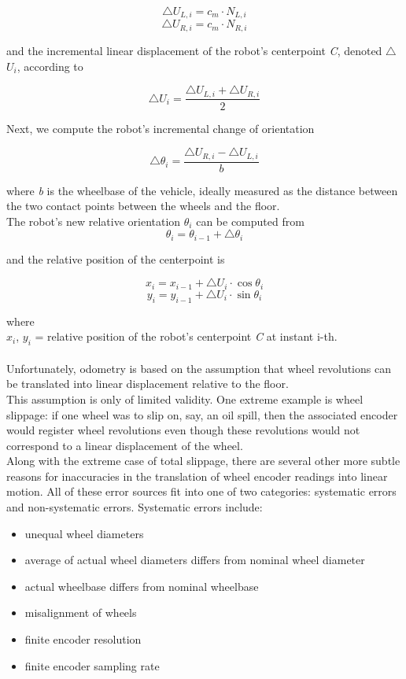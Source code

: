 \[
\bigtriangleup U_{L,i} = c_m \cdot N_{L,i}
\]
\[
\bigtriangleup U_{R,i} = c_m \cdot N_{R,i}
\]

and the incremental linear displacement of the robot's centerpoint
\textit{C}, denoted $\bigtriangleup$$U_{i}$, according to

\[
\bigtriangleup U_{i} =
\frac{{\bigtriangleup U_{L,i}} + {\bigtriangleup U_{R,i}}} {2}
\]

Next, we compute the robot's incremental change of orientation

\[
\bigtriangleup \theta_i =
\frac{{\bigtriangleup U_{R,i}} - {\bigtriangleup U_{L,i}}} {b}
\]

where \textit{b} is the wheelbase of the vehicle, ideally measured
as the distance between the two contact points between the wheels
and the floor.
\\
The robot's new relative orientation $\theta_i$ can be computed from
\[
\theta_i = \theta_{i-1} + \bigtriangleup \theta_i
\]

and the relative position of the centerpoint is

\[
x_i = x_{i-1} + \bigtriangleup U_{i} \cdot \cos \theta_i
\]
\[
y_i = y_{i-1} + \bigtriangleup U_{i} \cdot \sin \theta_i
\]

where
\\
\textit{$x_i$}, \textit{$y_i$} = relative position of the
robot's centerpoint \textit{C} at instant i-th.
\\
\\
Unfortunately, odometry is
based on the assumption that wheel revolutions can be translated
into linear displacement relative to the floor.
\\
This assumption is only of limited validity. One extreme example is
wheel slippage: if one wheel was to slip on, say, an oil spill, then
the associated encoder would register wheel revolutions even though
these revolutions would not correspond to a linear displacement of the
wheel.
\\
Along with the extreme case of total slippage, there are several other
more subtle reasons for inaccuracies in the translation of wheel encoder
readings into linear motion. All of these error sources fit into one
of two categories: systematic errors and non-systematic errors.
Systematic errors include:

\begin{itemize}
\item unequal wheel diameters
\item average of actual wheel diameters differs from 
  nominal wheel diameter
\item actual wheelbase differs from nominal wheelbase
\item misalignment of wheels
\item finite encoder resolution
\item finite encoder sampling rate
\end{itemize}

